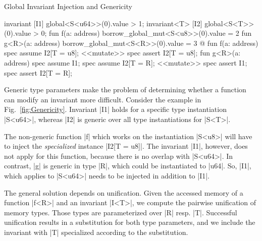 
\begin{Figure}
  \caption{Global Invariant Injection and Genericity}
  \label{fig:Genericity}
  \centering
\begin{MoveBox}
  invariant [I1] global<S<u64>>(0).value > 1;
  invariant<T> [I2] global<S<T>>(0).value > 0;
  fun f(a: address) { borrow_global_mut<S<u8>>(0).value = 2 }
  fun g<R>(a: address) { borrow_global_mut<S<R>>(0).value = 3 }
  @\transform@
  fun f(a: address) {
    spec assume I2[T = u8];
    <<mutate>>
    spec assert I2[T = u8];
  }
  fun g<R>(a: address) {
    spec assume I1;
    spec assume I2[T = R];
    <<mutate>>
    spec assert I1;
    spec assert I2[T = R];
  }
\end{MoveBox}
\end{Figure}

Generic type parameters make the problem of determining whether a function can
modify an invariant more difficult.  Consider the example in
Fig.~\ref{fig:Genericity}. Invariant |I1| holds for a specific type
instantiation |S<u64>|, whereas |I2| is generic over all type instantiations for
|S<T>|.

The non-generic function |f| which works on the instantiation |S<u8>| will have
to inject the \emph{specialized} instance |I2[T = u8]|. The invariant |I1|,
however, does not apply for this function, because there is no overlap with
|S<u64>|.  In contrast, |g| is generic in type |R|, which could be instantiated
to |u64|. So, |I1|, which applies to |S<u64>| needs to be injected
in addition to |I1|.

The general solution depends on unification.
Given the accessed memory of a function |f<R>| and an invariant |I<T>|, we
compute the pairwise unification of memory types. Those types are parameterized
over |R| resp. |T|. Successful unification results in a substitution for
both type parameters, and
we include the invariant with |T| specialized
according to the substitution.



